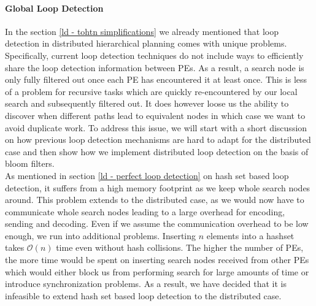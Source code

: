 \paragraph{Global Loop Detection}
\label{ld - global}
In the section \ref{ld - tohtn simplifications} we already mentioned that loop detection in distributed hierarchical planning comes with unique problems. Specifically, current loop detection techniques do not include ways to efficiently share the loop detection information between PEs. As a result, a search node is only fully filtered out once each PE has encountered it at least once. This is less of a problem for recursive tasks which are quickly re-encountered by our local search and subsequently filtered out. It does however loose us the ability to discover when different paths lead to equivalent nodes in which case we want to avoid duplicate work. To address this issue, we will start with a short discussion on how previous loop detection mechanisms are hard to adapt for the distributed case and then show how we implement distributed loop detection on the basis of bloom filters. \\
As mentioned in section \ref{ld - perfect loop detection} on hash set based loop detection, it suffers from a high memory footprint as we keep whole search nodes around. This problem extends to the distributed case, as we would now have to communicate whole search nodes leading to a large overhead for encoding, sending and decoding. Even if we assume the communication overhead to be low enough, we run into additional problems. Inserting $n$ elements into a hashset takes $\mathcal{O}(n)$ time even without hash collisions. The higher the number of PEs, the more time would be spent on inserting search nodes received from other PEs which would either block us from performing search for large amounts of time or introduce synchronization problems. As a result, we have decided that it is infeasible to extend hash set based loop detection to the distributed case. \\
\begin{comment}
- insertion of $n$ search nodes is expensive
- encoding and decoding becomes more difficult, especially


- previous section \ref{ld - tohtn simplifications} mentions that distributed planning makes loop detection less efficient
- recursion is still fine
- different paths leading to equivalent nodes are no longer detected

- normal loop detection gets worse in distributed (TO)HTN planning
- each worker tracks it's own set of known nodes
- if worker $w_1$ encounters a node, workers $w_2, \ldots, w_n$ will not filter that node out until they've encountered it themselves at least once

- we try to find a way to perform global loop detection
\end{comment}
